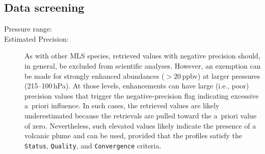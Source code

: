 \begin{nofloatpages}
\subsection{Data screening}
\label{sec:SO2Screening}
\begin{description}
  \item[Pressure range:]  \standardrangestatement
  \item[Estimated Precision:] 
  
  As with other MLS species, retrieved  values with negative precision should, in general, be excluded from scientific analyses. However, an exemption can be made for strongly enhanced  abundances ($>$20\,ppbv) at larger pressures (215--100\,hPa). At those levels,  enhancements can have large (i.e., poor) precision values that trigger the negative-precision flag indicating excessive a~priori influence. In such cases, the retrieved  values are likely underestimated because the retrievals are pulled toward the a~priori value of zero. Nevertheless, such elevated values likely indicate the presence of a volcanic plume and can be used, provided that the profiles satisfy the \texttt{Status}, \texttt{Quality}, and \texttt{Convergence} criteria.
  



\end{description}
\end{nofloatpages}
